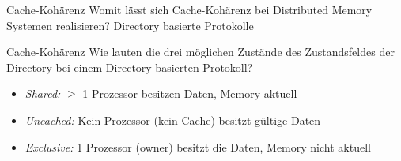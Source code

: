 \begin{aufgabe}{Cache-Kohärenz}
    Womit lässt sich Cache-Kohärenz bei Distributed Memory Systemen realisieren?
    \tcblower
    Directory basierte Protokolle
\end{aufgabe}

\begin{aufgabe}{Cache-Kohärenz}
    Wie lauten die drei möglichen Zustände des Zustandsfeldes der Directory bei einem Directory-basierten Protokoll?
    \tcblower
    \begin{itemize}
        \item \emph{Shared:}     $\geq$ 1 Prozessor besitzen Daten, Memory aktuell
        \item \emph{Uncached:}   Kein Prozessor (kein Cache) besitzt gültige Daten
        \item \emph{Exclusive:}  1 Prozessor (owner) besitzt die Daten, Memory nicht aktuell
    \end{itemize}
\end{aufgabe}